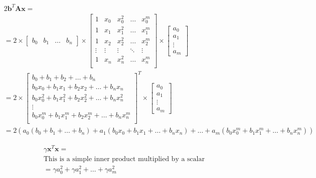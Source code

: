 \documentclass{article}
\newcommand{\x}{\mathbf{x}}
\newcommand{\A}{\mathbf{A}}
\newcommand{\B}{\mathbf{b}} %
\begin{document}
\begin{equation} \label{eqn:2bax}
\begin{split}
    & 2 \B ^T \A \x = \\
    & = 2 \times
    \begin{bmatrix}
        b_0 &
        b_1 &
        \ldots & 
        b_n
    \end{bmatrix}
    \times
    \begin{bmatrix}
        1 & x_0 & x_0 ^2 & \ldots & x_0^m \\
        1 & x_1 & x_1 ^2 & \ldots & x_1^m \\
        1 & x_2 & x_2 ^2 & \ldots & x_2^m \\
        \vdots & \vdots & \vdots & \ddots & \vdots \\
        1 & x_n & x_n ^2 & \ldots & x_n^m \\
    \end{bmatrix}
    \times
    \begin{bmatrix}
        a_0\\
        a_1\\
        \vdots\\
        a_m
    \end{bmatrix}\\
    & = 2 \times
    \begin{bmatrix}
        b_0 + b_1 + b_2 + \ldots + b_n \\
        b_0 x_0 + b_1 x_1 + b_2 x_2 + \ldots + b_n x_n \\
        b_0 x_0^2 + b_1 x_1^2 + b_2 x_2^2 + \ldots + b_n x_n^2 \\
        \vdots\\
        b_0 x_0^m + b_1 x_1^m + b_2 x_2^m + \ldots + b_n x_n^m \\
    \end{bmatrix} ^T
    \times
    \begin{bmatrix}
        a_0\\
        a_1\\
        \vdots\\
        a_m
    \end{bmatrix}\\
    & = 2(a_0 (b_0 + b_1 + \ldots + b_n) + a_1 (b_0 x_0 + b_1 x_1 + \ldots + b_n x_n) + \ldots + a_m (b_0 x_0^m + b_1 x_1^m + \ldots + b_n x_n^m))
\end{split}
\end{equation}

\begin{equation} \label{eqn:gxx}
\begin{split}
    & \gamma \x ^T \x = \\
    & \text{This is a simple inner product multiplied by a scalar} \\
    & = \gamma a_0 ^2 + \gamma a_1 ^2 + \ldots + \gamma a_m^2
\end{split}
\end{equation}
\end{document}
